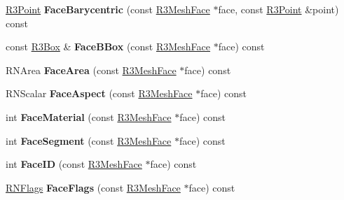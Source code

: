 \begin{DoxyCompactItemize}
\item 
\hyperlink{class_r3_point}{R3\+Point} {\bfseries Face\+Barycentric} (const \hyperlink{class_r3_mesh_face}{R3\+Mesh\+Face} $\ast$face, const \hyperlink{class_r3_point}{R3\+Point} \&point) const \hypertarget{class_r3_mesh_abfe9ea664ead23a4101e620de3e4dacd}{}\label{class_r3_mesh_abfe9ea664ead23a4101e620de3e4dacd}

\item 
const \hyperlink{class_r3_box}{R3\+Box} \& {\bfseries Face\+B\+Box} (const \hyperlink{class_r3_mesh_face}{R3\+Mesh\+Face} $\ast$face) const \hypertarget{class_r3_mesh_a2e20aff8ac1f3d3641133ab1ffa17937}{}\label{class_r3_mesh_a2e20aff8ac1f3d3641133ab1ffa17937}

\item 
R\+N\+Area {\bfseries Face\+Area} (const \hyperlink{class_r3_mesh_face}{R3\+Mesh\+Face} $\ast$face) const \hypertarget{class_r3_mesh_aa961eb00854dfce14442108fe4c446cb}{}\label{class_r3_mesh_aa961eb00854dfce14442108fe4c446cb}

\item 
R\+N\+Scalar {\bfseries Face\+Aspect} (const \hyperlink{class_r3_mesh_face}{R3\+Mesh\+Face} $\ast$face) const \hypertarget{class_r3_mesh_a30feeca818464e19db829884c1d1810d}{}\label{class_r3_mesh_a30feeca818464e19db829884c1d1810d}

\item 
int {\bfseries Face\+Material} (const \hyperlink{class_r3_mesh_face}{R3\+Mesh\+Face} $\ast$face) const \hypertarget{class_r3_mesh_a486b906fc12b45e4fcb75a74de1c67c4}{}\label{class_r3_mesh_a486b906fc12b45e4fcb75a74de1c67c4}

\item 
int {\bfseries Face\+Segment} (const \hyperlink{class_r3_mesh_face}{R3\+Mesh\+Face} $\ast$face) const \hypertarget{class_r3_mesh_a9c60c6da60c998efde0911b3638f4e78}{}\label{class_r3_mesh_a9c60c6da60c998efde0911b3638f4e78}

\item 
int {\bfseries Face\+ID} (const \hyperlink{class_r3_mesh_face}{R3\+Mesh\+Face} $\ast$face) const \hypertarget{class_r3_mesh_a1dd33c26bd3f340ce851ed744dc5681c}{}\label{class_r3_mesh_a1dd33c26bd3f340ce851ed744dc5681c}

\item 
\hyperlink{class_r_n_flags}{R\+N\+Flags} {\bfseries Face\+Flags} (const \hyperlink{class_r3_mesh_face}{R3\+Mesh\+Face} $\ast$face) const \hypertarget{class_r3_mesh_ad74b674a8425153dd7a2efef0755ff9c}{}\label{class_r3_mesh_ad74b674a8425153dd7a2efef0755ff9c}


\end{DoxyCompactItemize}
